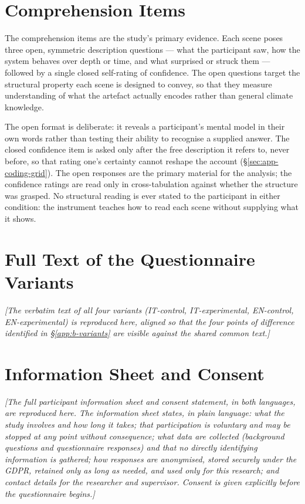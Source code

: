 \section{Comprehension Items}
\label{app:b-comprehension}

The comprehension items are the study's primary evidence. Each scene poses three open, symmetric description questions --- what the participant saw, how the system behaves over depth or time, and what surprised or struck them --- followed by a single closed self-rating of confidence. The open questions target the structural property each scene is designed to convey, so that they measure understanding of what the artefact actually encodes rather than general climate knowledge.

The open format is deliberate: it reveals a participant's mental model in their own words rather than testing their ability to recognise a supplied answer. The closed confidence item is asked only after the free description it refers to, never before, so that rating one's certainty cannot reshape the account (\S\ref{sec:app-coding-grid}). The open responses are the primary material for the analysis; the confidence ratings are read only in cross-tabulation against whether the structure was grasped. No structural reading is ever stated to the participant in either condition: the instrument teaches how to read each scene without supplying what it shows.

\section{Full Text of the Questionnaire Variants}
\label{app:b-fulltext}

\textit{[The verbatim text of all four variants (IT-control, IT-experimental, EN-control, EN-experimental) is reproduced here, aligned so that the four points of difference identified in \S\ref{app:b-variants} are visible against the shared common text.]}

\section{Information Sheet and Consent}
\label{app:b-consent}

\textit{[The full participant information sheet and consent statement, in both languages, are reproduced here. The information sheet states, in plain language: what the study involves and how long it takes; that participation is voluntary and may be stopped at any point without consequence; what data are collected (background questions and questionnaire responses) and that no directly identifying information is gathered; how responses are anonymised, stored securely under the GDPR, retained only as long as needed, and used only for this research; and contact details for the researcher and supervisor. Consent is given explicitly before the questionnaire begins.]}

